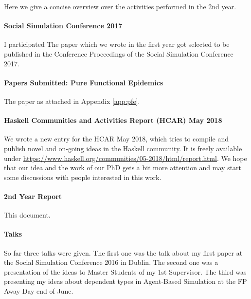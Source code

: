 Here we give a concise overview over the activities performed in the 2nd year.

\paragraph{Social Simulation Conference 2017}
I participated
The paper \cite{thaler_art_2017} which we wrote in the first year got selected to be published in the Conference Proceedings of the Social Simulation Conference 2017.

\paragraph{Papers Submitted: Pure Functional Epidemics}
The paper as attached in Appendix \ref{app:pfe}.

\paragraph{Haskell Communities and Activities Report (HCAR) May 2018}
We wrote a new entry for the HCAR May 2018, which tries to compile and publish novel and on-going ideas in the Haskell community. It is freely available under \url{https://www.haskell.org/communities/05-2018/html/report.html}. We hope that our idea and the work of our PhD gets a bit more attention and may start some discussions with people interested in this work.

\paragraph{2nd Year Report}
This document.

\paragraph{Talks}
So far three talks were given. The first one was the talk about my first paper at the Social Simulation Conference 2016 in Dublin. The second one was a presentation of the ideas to Master Students of my 1st Supervisor. The third was presenting my ideas about dependent types in Agent-Based Simulation at the FP Away Day end of June.